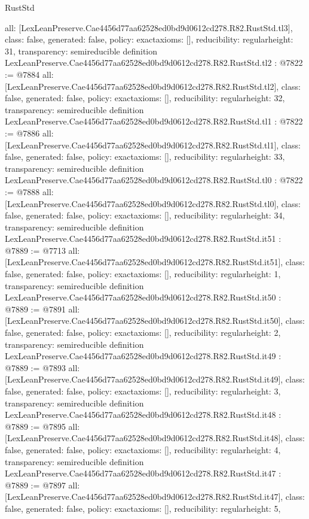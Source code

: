\begin{lexlean}{RustStd}
\begin{coremodule}
{  all: [LexLeanPreserve.Cae4456d77aa62528ed0bd9d0612cd278.R82.RustStd.tl3],
  class: false,
  generated: false,
  policy: exact{axioms: []},
  reducibility: regular{height: 31},
  transparency: semireducible
}
definition LexLeanPreserve.Cae4456d77aa62528ed0bd9d0612cd278.R82.RustStd.tl2 : @7822 := @7884 {
  all: [LexLeanPreserve.Cae4456d77aa62528ed0bd9d0612cd278.R82.RustStd.tl2],
  class: false,
  generated: false,
  policy: exact{axioms: []},
  reducibility: regular{height: 32},
  transparency: semireducible
}
definition LexLeanPreserve.Cae4456d77aa62528ed0bd9d0612cd278.R82.RustStd.tl1 : @7822 := @7886 {
  all: [LexLeanPreserve.Cae4456d77aa62528ed0bd9d0612cd278.R82.RustStd.tl1],
  class: false,
  generated: false,
  policy: exact{axioms: []},
  reducibility: regular{height: 33},
  transparency: semireducible
}
definition LexLeanPreserve.Cae4456d77aa62528ed0bd9d0612cd278.R82.RustStd.tl0 : @7822 := @7888 {
  all: [LexLeanPreserve.Cae4456d77aa62528ed0bd9d0612cd278.R82.RustStd.tl0],
  class: false,
  generated: false,
  policy: exact{axioms: []},
  reducibility: regular{height: 34},
  transparency: semireducible
}
definition LexLeanPreserve.Cae4456d77aa62528ed0bd9d0612cd278.R82.RustStd.it51 : @7889 := @7713 {
  all: [LexLeanPreserve.Cae4456d77aa62528ed0bd9d0612cd278.R82.RustStd.it51],
  class: false,
  generated: false,
  policy: exact{axioms: []},
  reducibility: regular{height: 1},
  transparency: semireducible
}
definition LexLeanPreserve.Cae4456d77aa62528ed0bd9d0612cd278.R82.RustStd.it50 : @7889 := @7891 {
  all: [LexLeanPreserve.Cae4456d77aa62528ed0bd9d0612cd278.R82.RustStd.it50],
  class: false,
  generated: false,
  policy: exact{axioms: []},
  reducibility: regular{height: 2},
  transparency: semireducible
}
definition LexLeanPreserve.Cae4456d77aa62528ed0bd9d0612cd278.R82.RustStd.it49 : @7889 := @7893 {
  all: [LexLeanPreserve.Cae4456d77aa62528ed0bd9d0612cd278.R82.RustStd.it49],
  class: false,
  generated: false,
  policy: exact{axioms: []},
  reducibility: regular{height: 3},
  transparency: semireducible
}
definition LexLeanPreserve.Cae4456d77aa62528ed0bd9d0612cd278.R82.RustStd.it48 : @7889 := @7895 {
  all: [LexLeanPreserve.Cae4456d77aa62528ed0bd9d0612cd278.R82.RustStd.it48],
  class: false,
  generated: false,
  policy: exact{axioms: []},
  reducibility: regular{height: 4},
  transparency: semireducible
}
definition LexLeanPreserve.Cae4456d77aa62528ed0bd9d0612cd278.R82.RustStd.it47 : @7889 := @7897 {
  all: [LexLeanPreserve.Cae4456d77aa62528ed0bd9d0612cd278.R82.RustStd.it47],
  class: false,
  generated: false,
  policy: exact{axioms: []},
  reducibility: regular{height: 5},
}
\end{coremodule}
\end{lexlean}
